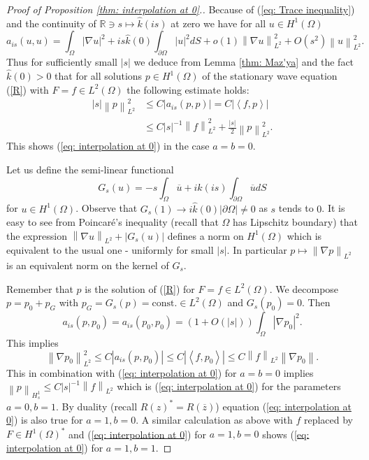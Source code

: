 \documentclass{amsart}
\newcommand{\abs}[1]{\left|#1\right|}
\newcommand{\norm}[1]{\left\| #1 \right\|}
\newcommand{\dual}[2]{\left\langle #1 , #2\right\rangle}
\newcommand{\khat}{\hat{k}}
\newcommand{\R}{\mathbb{R}}
\begin{document}
\begin{proof}[Proof of Proposition \ref{thm: interpolation at 0}.]
 Because of (\ref{eq: Trace inequality}) and the continuity of $\R\owns s\mapsto \hat{k}(is)$ at zero we have for all $u\in H^1(\Omega)$
 \begin{equation}\nonumber
  a_{is}(u,u) = \int_{\Omega} \abs{\nabla u}^2 + is\hat{k}(0)\int_{\partial\Omega} \abs{u}^2 dS + o(1)\norm{\nabla u}_{L^2}^2 + O(s^2)\norm{u}^2_{L^2} .
 \end{equation}
 Thus for sufficiently small $\abs{s}$ we deduce from Lemma \ref{thm: Maz'ya} and the fact $\hat{k}(0)>0$ that for all solutions $p\in H^1(\Omega)$ of the stationary wave equation (\ref{R}) with $F=f\in L^2(\Omega)$ the following estimate holds:
 \begin{align*}
  \abs{s}\norm{p}_{L^2}^2 &\leq C \abs{a_{is}(p,p)} = C \abs{\dual{f}{p}} \\
  &\leq C\abs{s}^{-1}\norm{f}^2_{L^2} + \frac{\abs{s}}{2}\norm{p}_{L^2}^2 .
 \end{align*}
 This shows (\ref{eq: interpolation at 0}) in the case $a=b=0$.
 
 Let us define the semi-linear functional
 \begin{equation}\nonumber
  G_s(u) = -s\int_{\Omega} \overline{u} + i\hat{k}(is)\int_{\partial\Omega} \overline{u} dS 
 \end{equation}
 for $u\in H^1(\Omega)$. Observe that $G_s(1)\rightarrow i\khat(0)\abs{\partial\Omega}\neq0$ as $s$ tends to $0$. It is easy to see from Poincar\'e's inequality (recall that $\Omega$ has Lipschitz boundary) that the expression $\norm{\nabla u}_{L^2} + \abs{G_s(u)}$ defines a norm on $H^1(\Omega)$ which is equivalent to the usual one - uniformly for small $\abs{s}$. In particular $p\mapsto\norm{\nabla p}_{L^2}$ is an equivalent norm on the kernel of $G_s$. 
 
 Remember that $p$ is the solution of (\ref{R}) for $F=f\in L^2(\Omega)$. We decompose $p=p_0+p_G$ with $p_G=G_s(p)=\text{const.}\in L^2(\Omega)$ and $G_s(p_0)=0$. Then
 \begin{equation}\nonumber
  a_{is}(p,p_0) = a_{is}(p_0,p_0) = (1+O(\abs{s}))\int_{\Omega} \abs{\nabla p_0}^2 .
 \end{equation}
 This implies 
 \begin{equation}\nonumber
  \norm{\nabla p_0}_{L^2}^2 \leq C\abs{a_{is}(p,p_0)} \leq C\abs{\dual{f}{p_0}} \leq C\norm{f}_{L^2}\norm{\nabla p_0} .
 \end{equation}
 This in combination with (\ref{eq: interpolation at 0}) for $a=b=0$ implies $\norm{p}_{H^1_s}\leq C\abs{s}^{-1}\norm{f}_{L^2}$ which is (\ref{eq: interpolation at 0}) for the parameters $a=0, b=1$. By duality (recall $R(z)^* = R(\overline{z})$) equation (\ref{eq: interpolation at 0}) is also true for $a=1,b=0$. A similar calculation as above with $f$ replaced by $F\in H^1(\Omega)^*$ and (\ref{eq: interpolation at 0}) for $a=1,b=0$ shows (\ref{eq: interpolation at 0}) for $a=1, b=1$. 
 

\end{proof}
\end{document}
